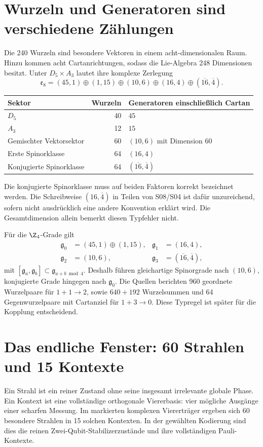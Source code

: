 \section{Wurzeln und Generatoren sind verschiedene Zählungen}
Die 240 Wurzeln sind besondere Vektoren in einem acht-dimensionalen Raum. Hinzu kommen acht Cartanrichtungen, sodass die Lie-Algebra 248 Dimensionen besitzt. Unter $D_5\times A_3$ lautet ihre komplexe Zerlegung
\begin{equation}
\mathfrak e_8=(45,1)\oplus(1,15)\oplus(10,6)
\oplus(16,4)\oplus(\overline{16},\overline4).
\label{eq:branch}
\end{equation}
\par\noindent\begin{tabularx}{\linewidth}{L{47mm}rY}
\toprule
\textbf{Sektor}&\textbf{Wurzeln}&\textbf{Generatoren einschließlich Cartan}\\\midrule
$D_5$&40&$45$\\
$A_3$&12&$15$\\
Gemischter Vektorsektor&60&$(10,6)$ mit Dimension $60$\\
Erste Spinorklasse&64&$(16,4)$\\
Konjugierte Spinorklasse&64&$(\overline{16},\overline4)$\\\bottomrule
\end{tabularx}\par

Die konjugierte Spinorklasse muss auf beiden Faktoren korrekt bezeichnet werden. Die Schreibweise $(16,\overline4)$ in Teilen von S08/S04 ist dafür unzureichend, sofern nicht ausdrücklich eine andere Konvention erklärt wird. Die Gesamtdimension allein bemerkt diesen Typfehler nicht.

Für die $\Z_4$-Grade gilt
\begin{align}
\mathfrak g_0&=(45,1)\oplus(1,15),&\mathfrak g_1&=(16,4),\\
\mathfrak g_2&=(10,6),&\mathfrak g_3&=(\overline{16},\overline4),
\end{align}
mit $[\mathfrak g_a,\mathfrak g_b]\subset\mathfrak g_{a+b\bmod4}$. Deshalb führen gleichartige Spinorgrade nach $(10,6)$, konjugierte Grade hingegen nach $\mathfrak g_0$. Die Quellen berichten 960 geordnete Wurzelpaare für $1+1\to2$, sowie $640+192$ Wurzelsummen und 64 Gegenwurzelpaare mit Cartanziel für $1+3\to0$. Diese Typregel ist später für die Kopplung entscheidend.

\section{Das endliche Fenster: 60 Strahlen und 15 Kontexte}
Ein Strahl ist ein reiner Zustand ohne seine insgesamt irrelevante globale Phase. Ein Kontext ist eine vollständige orthogonale Viererbasis: vier mögliche Ausgänge einer scharfen Messung. Im markierten komplexen Viererträger ergeben sich 60 besondere Strahlen in 15 solchen Kontexten. In der gewählten Kodierung sind dies die reinen Zwei-Qubit-Stabilizerzustände und ihre vollständigen Pauli-Kontexte. 

